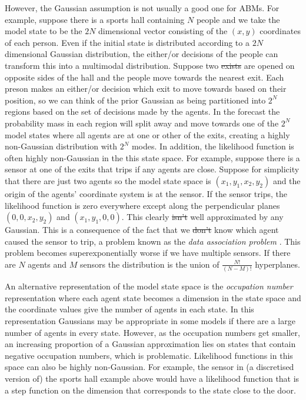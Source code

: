 \documentclass{article}
\providecommand{\DIFaddtex}[1]{{\protect\color{blue}\uwave{#1}}} %
\providecommand{\DIFdeltex}[1]{{\protect\color{red}\sout{#1}}}                      %
\providecommand{\DIFaddbegin}{} %
\providecommand{\DIFaddend}{} %
\providecommand{\DIFdelbegin}{} %
\providecommand{\DIFdelend}{} %
\providecommand{\DIFadd}[1]{\texorpdfstring{\DIFaddtex{#1}}{#1}} %
\providecommand{\DIFdel}[1]{\texorpdfstring{\DIFdeltex{#1}}{}} %
\newcommand{\DIFscaledelfig}{0.5}
\newlength{\DIFdelgraphicswidth} %
\newlength{\DIFdelgraphicsheight} %
\newcommand{\DIFaddincludegraphics}[2][]{{\color{blue}\fbox{\DIFOincludegraphics[#1]{#2}}}} %
\newcommand{\DIFdelincludegraphics}[2][]{%
\sbox{\DIFdelgraphicsbox}{\DIFOincludegraphics[#1]{#2}}%
\settoboxwidth{\DIFdelgraphicswidth}{\DIFdelgraphicsbox} %
\settoboxtotalheight{\DIFdelgraphicsheight}{\DIFdelgraphicsbox} %
\scalebox{\DIFscaledelfig}{%
\parbox[b]{\DIFdelgraphicswidth}{\usebox{\DIFdelgraphicsbox}\\[-\baselineskip] \rule{\DIFdelgraphicswidth}{0em}}\llap{\resizebox{\DIFdelgraphicswidth}{\DIFdelgraphicsheight}{%
\setlength{\unitlength}{\DIFdelgraphicswidth}%
\begin{picture}(1,1)%
\thicklines\linethickness{2pt} %
{\color[rgb]{1,0,0}\put(0,0){\framebox(1,1){}}}%
{\color[rgb]{1,0,0}\put(0,0){\line( 1,1){1}}}%
{\color[rgb]{1,0,0}\put(0,1){\line(1,-1){1}}}%
\end{picture}%
}\hspace*{3pt}}} %
} %
\DeclareRobustCommand{\DIFaddbegin}{\DIFOaddbegin \let\includegraphics\DIFaddincludegraphics} %
\DeclareRobustCommand{\DIFaddend}{\DIFOaddend \let\includegraphics\DIFOincludegraphics} %
\DeclareRobustCommand{\DIFdelbegin}{\DIFOdelbegin \let\includegraphics\DIFdelincludegraphics} %
\DeclareRobustCommand{\DIFdelend}{\DIFOaddend \let\includegraphics\DIFOincludegraphics} %
\begin{document}
However, the Gaussian assumption is not usually a good one for ABMs. For example, suppose there is a sports hall containing $N$ people and we take the model state to be the $2N$ dimensional vector consisting of the $(x,y)$ coordinates of each person. Even if the initial state is distributed according to a $2N$ dimensional Gaussian distribution, the either/or decisions of the people can transform this into a multimodal distribution. Suppose two \DIFdelbegin \DIFdel{exists }\DIFdelend \DIFaddbegin \DIFadd{exits }\DIFaddend are opened on opposite sides of the hall and the people move towards the nearest exit. Each preson makes an either/or decision which exit to move towards based on their position, so we can think of the prior Gaussian as being partitioned into $2^N$ regions based on the set of decisions made by the agents. In the forecast the probability mass in each region will split away and move towards one of the $2^N$ model states where all agents are at one or other of the exits, creating a highly non-Gaussian distribution with $2^N$ modes. In addition, the likelihood function is often highly non-Gaussian in the this state space. For example, suppose there is a sensor at one of the exits that trips if any agents are close. Suppose for simplicity that there are just two agents so the model state space is $(x_1,y_1,x_2,y_2)$ and the origin of the agents' coordinate system is at the sensor. If the sensor trips, the likelihood function is zero everywhere except along the perpendicular planes $(0,0,x_2,y_2)$ and $(x_1,y_1,0,0)$. This clearly \DIFdelbegin \DIFdel{isn't }\DIFdelend \DIFaddbegin \DIFadd{is not }\DIFaddend well approximated by any Gaussian. This is a consequence of the fact that we \DIFdelbegin \DIFdel{don't }\DIFdelend \DIFaddbegin \DIFadd{do not }\DIFaddend know which agent caused the sensor to trip, a problem known as the \textit{data association problem} \citep{lueck_who_2019}. This problem becomes superexponentially worse if we have multiple sensors. If there are $N$ agents and $M$ sensors the distribution is the union of $\frac{N!}{(N-M)!}$ hyperplanes.

An alternative representation of the model state space is the \textit{occupation number} representation where each agent state becomes a dimension in the state space and the coordinate values give the number of agents in each state. In this representation Gaussians may be appropriate in some models if there are a large number of agents in every state. However, as the occupation numbers get smaller, an increasing proportion of a Gaussian approximation lies on states that contain negative occupation numbers, which is problematic. Likelihood functions in this space can also be highly non-Gaussian. For example, the sensor in (a discretised version of) the sports hall example above would have a likelihood function that is a step function on the dimension that corresponds to the state close to the door.
\end{document}
